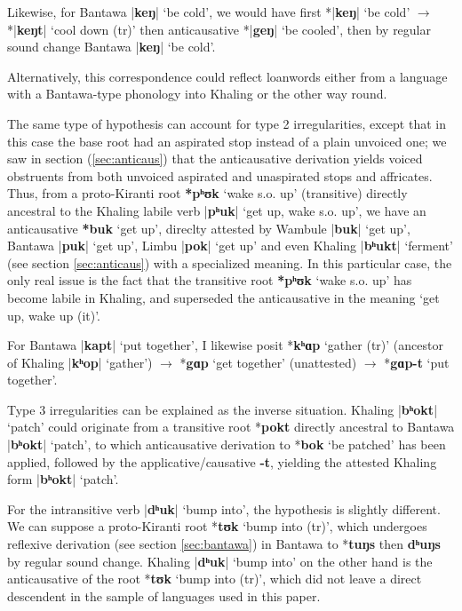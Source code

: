 \documentclass[oldfontcommands,oneside,a4paper,11pt]{article}
\newcommand{\ipa}[1]{\textbf{{\phon\mbox{#1}}}} %
\newcommand{\dhatu}[2]{|\ipa{#1}| `#2'}
\begin{document}
Likewise, for Bantawa \dhatu{keŋ}{be cold}, we would have first *\dhatu{keŋ}{be cold} $\rightarrow$ *\dhatu{keŋt}{cool down (tr)} then anticausative *\dhatu{geŋ}{be cooled}, then by regular sound change Bantawa \dhatu{keŋ}{be cold}.
 
 Alternatively, this correspondence could reflect loanwords either from a language with a Bantawa-type phonology into Khaling or the other way round.
 
The same type of hypothesis can account for type 2 irregularities, except that in this case the base root  had an aspirated stop instead of a plain unvoiced one; we saw in section  (\ref{sec:anticaus}) that the anticausative derivation yields voiced obstruents from both unvoiced aspirated and unaspirated stops and affricates. Thus, from a proto-Kiranti root \ipa{*pʰʊk} `wake s.o. up' (transitive) directly ancestral to the Khaling labile verb \dhatu{pʰuk}{get up, wake s.o. up}, we have an anticausative \ipa{*buk} `get up', direclty attested by Wambule \dhatu{buk}{get up}, Bantawa \dhatu{puk}{get up}, Limbu \dhatu{pok}{get up} and even Khaling \dhatu{bʰukt}{ferment} (see section \ref{sec:anticaus}) with a specialized meaning. In this particular case, the only real issue is the fact that the transitive root \ipa{*pʰʊk} `wake s.o. up' has become labile in Khaling, and superseded the anticausative in the meaning `get up, wake up (it)'.

For Bantawa  \dhatu{kapt}{put together}, I likewise posit *\ipa{kʰɑp} `gather (tr)' (ancestor of Khaling \dhatu{kʰop}{gather}) $\rightarrow$  *\ipa{gɑp} `get together' (unattested) $\rightarrow$  *\ipa{gɑp-t} `put together'.
 
Type 3  irregularities can be explained as the inverse situation. Khaling \dhatu{bʰokt}{patch} could originate from a transitive root *\ipa{pokt} directly ancestral to Bantawa \dhatu{bʰokt}{patch}, to which anticausative derivation to *\ipa{bok} `be patched' has been applied, followed by the applicative/causative \ipa{-t}, yielding the attested Khaling form \dhatu{bʰokt}{patch}. 

For the intransitive verb \dhatu{dʰuk}{bump into}, the hypothesis is slightly different. We can suppose a proto-Kiranti root *\ipa{tʊk} `bump into (tr)', which undergoes reflexive derivation (see section \ref{sec:bantawa}) in Bantawa to *\ipa{tuŋs} then \ipa{dʰuŋs} by regular sound change. Khaling \dhatu{dʰuk}{bump into} on the other hand is the anticausative of the root *\ipa{tʊk} `bump into (tr)', which did not leave a direct descendent in the sample of languages used in this paper.
 
\end{document}

